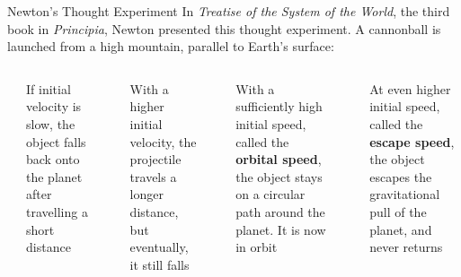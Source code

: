 \documentclass[12pt,compress,aspectratio=169]{beamer}
\begin{document}
\begin{frame}{Newton's Thought Experiment}
  In \emph{Treatise of the System of the World}, the third book in
  \emph{Principia}, Newton presented this thought experiment. A cannonball is
  launched from a high mountain, parallel to Earth's surface:

  \vspace{-.2in}\begin{columns}[T]
    \begin{center}
    \end{center}
    {\scriptsize If initial velocity is slow, the object falls back onto the
      planet after travelling a short distance\par}
  
    \begin{center}
    \end{center}
    {\scriptsize With a higher initial velocity, the projectile travels a
      longer distance, but eventually, it still falls\par}

    \begin{center}
    \end{center}
    {\scriptsize With a sufficiently high initial speed, called the
      \textbf{orbital speed}, the object stays on a circular path around the
      planet. It is now in orbit\par}

    \begin{center}
    \end{center}
    {\scriptsize At even higher initial speed, called the \textbf{escape speed},
      the object escapes the gravitational pull of the planet, and never
      returns\par}
  \end{columns}
\end{frame}
\end{document}
